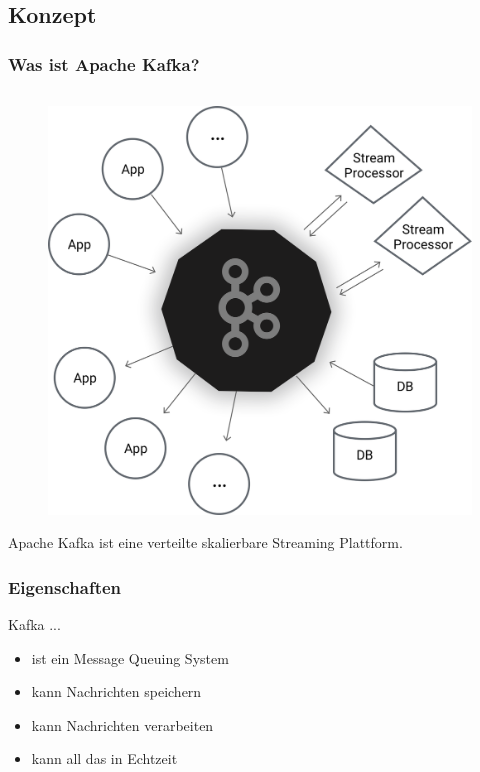 \begin{frame}
\section{Konzept}
\frametitle{Was ist Apache Kafka?}
\begin{columns}[T]
	\begin{column}[T]{0.49\textwidth}
		
	\end{column}
	\begin{column}[T]{0.49\textwidth}
		
\end{column}
\end{columns}

\centering
\begin{figure}[h]
	\includegraphics[scale=0.1]{figure/kafka_diagram.png}
\end{figure}

Apache Kafka ist eine verteilte skalierbare Streaming Plattform.

\end{frame}


\begin{frame}
\frametitle{Eigenschaften}
Kafka ...
\begin{itemize}
	\item ist ein Message Queuing System
	\item kann Nachrichten speichern
	\item kann Nachrichten verarbeiten
	\item kann all das in Echtzeit
\end{itemize}
\end{frame}

